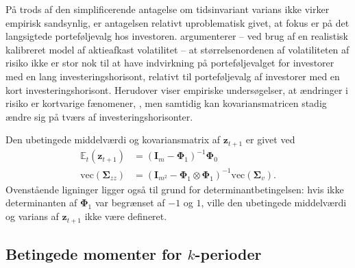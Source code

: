 \documentclass[
  a4paper,
  oneside]{memoir}
\begin{document}
\vspace{5mm}

På trods af den simplificerende antagelse om tidsinvariant varians ikke virker empirisk sandsynlig, er antagelsen relativt uproblematisk givet, at fokus er på det langsigtede porteføljevalg hos investoren. \citep{Chacko2005} argumenterer -- ved brug af en realistisk kalibreret model af aktieafkast volatilitet -- at størrelsenordenen af volatiliteten af risiko ikke er stor nok til at have indvirkning på porteføljevalget for investorer med en lang investeringshorisont, relativt til porteføljevalg af investorer med en kort investeringshorisont. Herudover viser empiriske undersøgelser, at ændringer i risiko er kortvarige fænomener, \citep{Camp1987}, men samtidig kan kovariansmatricen stadig ændre sig på tværs af investeringshorisonter.

\vspace{5mm}

Den ubetingede middelværdi og kovariansmatrix af \(\bm{z}_{t+1}\) er givet ved
\begin{align*}
        \mathbb{E}_t(\bm{z}_{t+1}) &= (\bm{I}_m-\bm{\Phi}_1)^{-1}\bm{\Phi}_0\\
        \text{vec}(\bm{\Sigma}_{zz}) &= (\bm{I}_{m^2}-\bm{\Phi}_1\otimes\bm{\Phi}_1)^{-1}\text{vec}(\bm{\Sigma}_v).
    \end{align*}
Ovenstående ligninger ligger også til grund for determinantbetingelsen: hvis ikke determinanten af \(\bm{\Phi}_1\) var begrænset af \(-1\) og \(1\), ville den ubetingede middelværdi og varians af \(\bm{z}_{t+1}\) ikke være defineret.

\subsection{Betingede momenter for $k$-perioder}
\end{document}
